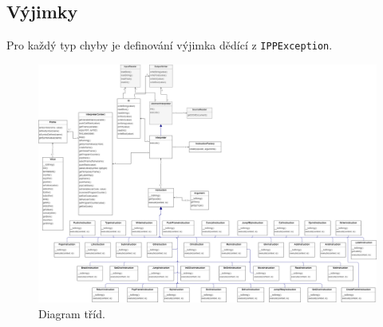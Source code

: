 \documentclass[11pt, letterpaper]{article}
\begin{document}
\subsection{Výjimky}

Pro každý typ chyby je definování výjimka dědící z \texttt{IPPException}.

\vspace{6em}

\begin{figure}[h]
  \centering
  \includegraphics[width=\textwidth]{diagram.png}
  \caption{Diagram tříd.}
  \label{fig:diagram}
\end{figure}
\end{document}
